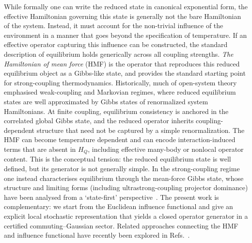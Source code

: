 While formally one can write the reduced state in canonical exponential form, the effective Hamiltonian governing this state is generally not the bare Hamiltonian of the system. Instead, it must account for the non-trivial influence of the environment in a manner that goes beyond the specification of temperature. If an effective operator capturing this influence can be constructed, the standard description of equilibrium holds generically across all coupling strengths. \emph{The Hamiltonian of mean force} (HMF) is the operator that reproduces this reduced equilibrium object as a Gibbs-like state, and provides the standard starting point for strong-coupling thermodynamics\cite{campisiFluctuationTheoremArbitrary2009,jarzynskiNonequilibriumWorkTheorem2004,jarzynskiStochasticMacroscopicThermodynamics2017,talknerColloquiumStatisticalMechanics2020,seifertFirstSecondLaw2016}. Historically, much of open-system theory emphasised weak-coupling and Markovian regimes, where reduced equilibrium states are well approximated by Gibbs states of renormalized system Hamiltonians. At finite coupling, equilibrium consistency is anchored in the correlated global Gibbs state, and the reduced operator inherits coupling-dependent structure that need not be captured by a simple renormalization. The HMF can become temperature dependent and can encode interaction-induced terms that are absent in $H_Q$, including effective many-body or nonlocal operator content\cite{talknerColloquiumStatisticalMechanics2020,seifertFirstSecondLaw2016,espositoNatureHeatStrongly2015,hanggiFiniteQuantumDissipation2008,ingoldSpecificHeatAnomalies2009,correaPotentialRenormalisationLamb2025}. This is the conceptual tension: the reduced equilibrium state is well defined, but its generator is not generally simple. In the strong-coupling regime one instead characterises equilibrium through the mean-force Gibbs state, whose structure and limiting forms (including ultrastrong-coupling projector dominance) have been analysed from a `state-first' perspective~\cite{cresserWeakUltrastrongCoupling2021a,trushechkinOpenQuantumSystem2022}. The present work is complementary: we start from the Euclidean influence functional and give an explicit local stochastic representation that yields a closed operator generator in a certified commuting--Gaussian sector. Related approaches connecting the HMF and influence functional have recently been explored in Refs.~\cite{hoggTutorialStochasticSimulation2024,hoggEnhancedEntanglement2024}. 

